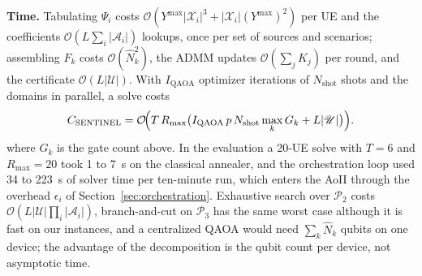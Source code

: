 \textbf{Time.} Tabulating $\Psi_i$ costs $\mathcal{O}(Y^{\max}|\mathcal{X}_i|^3+|\mathcal{X}_i|(Y^{\max})^2)$ per UE
and the coefficients $\mathcal{O}(L\sum_i|\mathscr{A}_i|)$ lookups, once per set of sources and scenarios; assembling
$F_k$ costs $\mathcal{O}(\hat N_k^2)$, the ADMM updates $\mathcal{O}(\sum_j K_j)$ per round, and the certificate
$\mathcal{O}(L|\mathscr{U}|)$. With $I_{\mathrm{QAOA}}$ optimizer iterations of $N_{\mathrm{shot}}$ shots and the
domains in parallel, a solve costs
\begin{equation}
    C_{\mathrm{SENTINEL}}=\mathcal{O}\!\Bigl(T\,R_{\max}\bigl(I_{\mathrm{QAOA}}\,p\,N_{\mathrm{shot}}\max_k G_k
    +L|\mathscr{U}|\bigr)\Bigr).
    \label{eq:complexity}
\end{equation}
where $G_k$ is the gate count above. In the evaluation a 20-UE solve with $T=6$ and $R_{\max}=20$ took 1 to 7~s on
the classical annealer, and the orchestration loop used 34 to 223~s of solver time per ten-minute run, which enters
the AoII through the overhead $\epsilon_i$ of Section~\ref{sec:orchestration}. Exhaustive search over
$\mathscr{P}_2$ costs $\mathcal{O}(L|\mathscr{U}|\prod_i|\mathscr{A}_i|)$, branch-and-cut on $\mathscr{P}_3$ has
the same worst case although it is fast on our instances, and a centralized QAOA would need $\sum_k\hat N_k$ qubits
on one device; the advantage of the decomposition is the qubit count per device, not asymptotic time.
